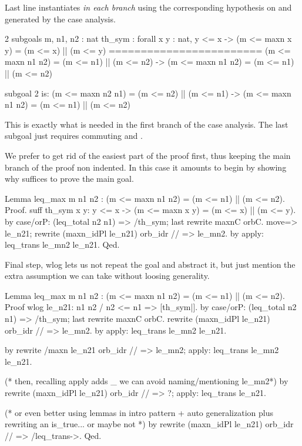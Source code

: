 Last line instantiates  \emph{in each branch} using the corresponding
hypothesis on  and  generated by the case analysis.

\begin{coqout}{}{}
2 subgoals
m, n1, n2 : nat
th_sym : forall x y : nat,
         y <= x -> (m <= maxn x y) = (m <= x) || (m <= y)
========================
(m <= maxn n1 n2) = (m <= n1) || (m <= n2) ->
(m <= maxn n1 n2) = (m <= n1) || (m <= n2)

subgoal 2 is:
(m <= maxn n2 n1) = (m <= n2) || (m <= n1) ->
(m <= maxn n1 n2) = (m <= n1) || (m <= n2)
\end{coqout}

This is exactly what is needed in the first branch of the case analysis.
The last subgoal just requires commuting  and \C{||}.

We prefer to get rid of the easiest part of the proof first, thus
keeping the main branch of the proof non indented. In this case
it amounts to begin by showing why  suffices to prove the main
goal.

\begin{coq}{}{}
Lemma leq_max m n1 n2 : (m <= maxn n1 n2) = (m <= n1) || (m <= n2).
Proof.
suff th_sym x y: y <= x -> (m <= maxn x y) = (m <= x) || (m <= y).
  by case/orP: (leq_total n2 n1) => /th_sym; last rewrite maxnC orbC.
move=> le_n21; rewrite (maxn_idPl le_n21) orb_idr // => le_mn2.
by apply: leq_trans le_mn2 le_n21.
Qed.
\end{coq}

Final step, wlog lets us not repeat the goal and abstract it, but
just mention the extra assumption we can take without loosing
generality.

\begin{coq}{}{}
Lemma leq_max m n1 n2 : (m <= maxn n1 n2) = (m <= n1) || (m <= n2).
Proof
wlog le_n21: n1 n2 / n2 <= n1 => [th_sym|].
  by case/orP: (leq_total n2 n1) => /th_sym; last rewrite maxnC orbC.
rewrite (maxn_idPl le_n21) orb_idr // => le_mn2.
by apply: leq_trans le_mn2 le_n21.

by rewrite /maxn le_n21 orb_idr // => le_mn2; apply: leq_trans le_mn2 le_n21.

(* then, recalling apply adds _ we can avoid naming/mentioning le_mn2*)
by rewrite (maxn_idPl le_n21) orb_idr // => ?; apply: leq_trans le_n21.

(* or even better using lemmas in intro pattern + auto generalization
   plus rewriting an is_true... or maybe not *)
by rewrite (maxn_idPl le_n21) orb_idr // => /leq_trans->.
Qed.
\end{coq}

